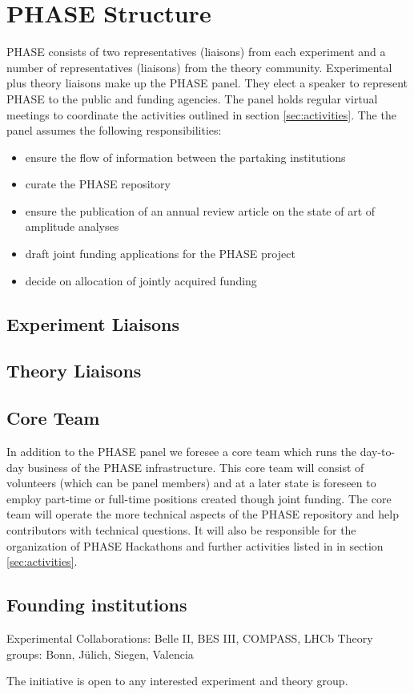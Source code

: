\section{PHASE Structure}
\label{sec:structure}
PHASE consists of two representatives (liaisons) from each experiment and a number of representatives (liaisons) from the theory community. Experimental plus theory liaisons make up the PHASE panel. They elect a speaker to represent PHASE to the public and funding agencies. The panel holds regular virtual meetings to coordinate the activities outlined in section \ref{sec:activities}. The the panel assumes the following responsibilities:
\begin{itemize}
\item ensure the flow of information between the partaking institutions
\item curate the PHASE repository
\item ensure the publication of an annual review article on the state of art of amplitude analyses
\item draft joint funding applications for the PHASE project
\item decide on allocation of jointly acquired funding
\end{itemize}



\subsection{Experiment Liaisons}

\subsection{Theory Liaisons}

\subsection{Core Team}

In addition to the PHASE panel we foresee a core team which runs the day-to-day business of the PHASE infrastructure. This core team will consist of volunteers (which can be panel members) and at a later state is foreseen to employ part-time or full-time positions created though joint funding. The core team will operate the more technical aspects of the PHASE repository and help contributors with technical questions. It will also be responsible for the organization of PHASE Hackathons and further activities listed in in section \ref{sec:activities}.

\subsection{Founding institutions}
Experimental Collaborations: Belle II, BES III, COMPASS, LHCb 
Theory groups: Bonn, J\"ulich, Siegen, Valencia

The initiative is open to any interested experiment and theory group.
